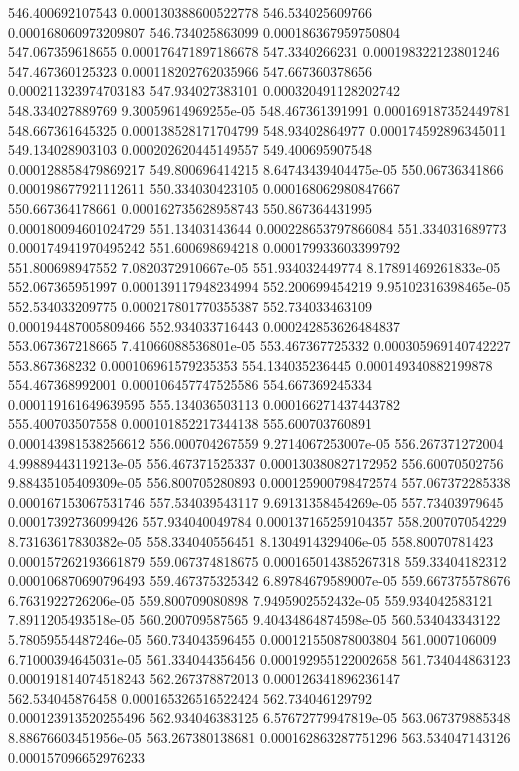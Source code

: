 {546.400692107543 0.000130388600522778
546.534025609766 0.000168060973209807
546.734025863099 0.000186367959750804
547.067359618655 0.000176471897186678
547.3340266231 0.000198322123801246
547.467360125323 0.000118202762035966
547.667360378656 0.000211323974703183
547.934027383101 0.000320491128202742
548.334027889769 9.30059614969255e-05
548.467361391991 0.000169187352449781
548.667361645325 0.000138528171704799
548.93402864977 0.000174592896345011
549.134028903103 0.000202620445149557
549.400695907548 0.000128858479869217
549.800696414215 8.64743439404475e-05
550.06736341866 0.000198677921112611
550.334030423105 0.000168062980847667
550.667364178661 0.000162735628958743
550.867364431995 0.000180094601024729
551.13403143644 0.000228653797866084
551.334031689773 0.000174941970495242
551.600698694218 0.000179933603399792
551.800698947552 7.0820372910667e-05
551.934032449774 8.17891469261833e-05
552.067365951997 0.000139117948234994
552.200699454219 9.95102316398465e-05
552.534033209775 0.000217801770355387
552.734033463109 0.000194487005809466
552.934033716443 0.000242853626484837
553.067367218665 7.41066088536801e-05
553.467367725332 0.000305969140742227
553.867368232 0.000106961579235353
554.134035236445 0.000149340882199878
554.467368992001 0.000106457747525586
554.667369245334 0.000119161649639595
555.134036503113 0.000166271437443782
555.400703507558 0.000101852217344138
555.600703760891 0.000143981538256612
556.000704267559 9.2714067253007e-05
556.267371272004 4.99889443119213e-05
556.467371525337 0.000130380827172952
556.60070502756 9.88435105409309e-05
556.800705280893 0.000125900798472574
557.067372285338 0.000167153067531746
557.534039543117 9.69131358454269e-05
557.73403979645 0.00017392736099426
557.934040049784 0.000137165259104357
558.200707054229 8.73163617830382e-05
558.334040556451 8.1304914329406e-05
558.80070781423 0.000157262193661879
559.067374818675 0.000165014385267318
559.33404182312 0.000106870690796493
559.467375325342 6.89784679589007e-05
559.667375578676 6.7631922726206e-05
559.800709080898 7.9495902552432e-05
559.934042583121 7.8911205493518e-05
560.200709587565 9.40434864874598e-05
560.534043343122 5.78059554487246e-05
560.734043596455 0.000121550878003804
561.0007106009 6.71000394645031e-05
561.334044356456 0.000192955122002658
561.734044863123 0.000191814074518243
562.267378872013 0.000126341896236147
562.534045876458 0.000165326516522424
562.734046129792 0.000123913520255496
562.934046383125 6.57672779947819e-05
563.067379885348 8.88676603451956e-05
563.267380138681 0.000162863287751296
563.534047143126 0.000157096652976233
}
